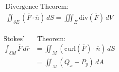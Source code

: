 \documentclass[12pt]{article}
\begin{document}
\begin{multicols}{2}

  \begin{equation*}
    \begin{split}
      \text{Divergence Theorem:}\\
      \iint_{\delta E}(\overline{F}\cdot\overline{n})\,dS=\iiint_E\text{div}(\overline{F})\,dV\\
    \end{split}
  \end{equation*}

  \begin{equation*}
    \begin{split}
    \text{Stokes'}& \text{ Theorem:}\\
      \int_{\delta M}\overline{F}\,d\overline{r}&=\iint_M(\text{curl}(\overline{F})\cdot\overline{n})\,dS\\
      &=\iint_M(Q_x-P_y)\,dA
    \end{split}
  \end{equation*}

\end{multicols}
\end{document}
